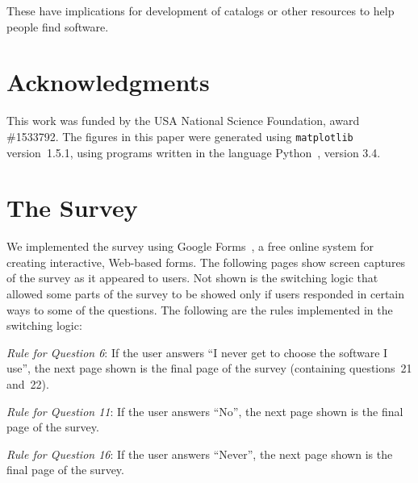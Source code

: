 \documentclass{casicswhitepaper}
\begin{document}
These have implications for development of catalogs or other resources to help people find software.  




\section{Acknowledgments}

This work was funded by the USA National Science Foundation, award \#1533792.  The figures in this paper were generated using \texttt{matplotlib}~\cite{hunter2007matplotlib} version~1.5.1, using programs written in the language Python~\cite{vanRossum1991interactively, perez2011python}, version 3.4.


\appendix
\section{The Survey}
\label{apdx:survey}

We implemented the survey using Google Forms~\cite{googleforms}, a free online system for creating interactive, Web-based forms.  The following pages show screen captures of the survey as it appeared to users.  Not shown is the switching logic that allowed some parts of the survey to be showed only if users responded in certain ways to some of the questions.  The following are the rules implemented in the switching logic:
\begin{description}

\item \emph{Rule for Question 6}: If the user answers ``I never get to choose the software I use'', the next page shown is the final page of the survey (containing questions~21 and~22).

\item  \emph{Rule for Question 11}: If the user answers ``No'', the next page shown is the final page of the survey.

\item \emph{Rule for Question 16}:  If the user answers ``Never'', the next page shown is the final page of the survey.

\end{description}
\end{document}
